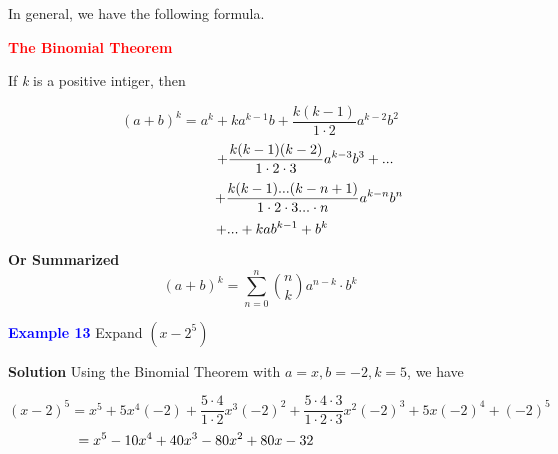 \documentclass{article}
\begin{document}
	In general, we have the following formula.

	\textcolor{red} {\textbf{The Binomial Theorem}}

	\vspace{5mm} 							%
	If \textit{k} is a positive intiger, then
	
	
	\[
		(a+b)^k = a^k + ka^{k-1} b+\frac{k(k-1)}{1\cdot2}a^{k-2} b^2
	\]
	\[
	\hspace*{2.3cm}   	+\frac{k(k-1)(k-2)}{1\cdot2\cdot3} a^{k-3} b^3 + ...
	\]
	\[
	\hspace*{2.5cm}	+\frac{k(k-1)...(k-n+1)}{1\cdot 2\cdot 3 ...\cdot n } a^{k-n} b^n 
	\]
	\[
	\hspace*{0.6cm}	+ ... + kab^{k-1}+b^k
	\]								%
									
									
	\textcolor{BlueGreen}{\textbf{Or Summarized}}
	\[
	(a+b)^k = \sum_{n=0}^{n} \binom{n}{k} a^{n-k}\cdot b^k
	\]
	
	
	\textcolor{blue}{\textbf{Example 13}}  Expand $(x-2^5)$
	
	\textbf{Solution} \quad Using the Binomial Theorem with $a = x, b = -2, k = 5$, we have
	
	\[
		(x-2)^5 = x^5 + 5x^4(-2)+\frac{5\cdot4}{1\cdot2}x^3(-2)^2+\frac{5\cdot4\cdot3}{1\cdot2\cdot3}
		x^2(-2)^3+5x(-2)^4+(-2)^5
	\]
	\[
	\hspace*{-3.2cm}	=x^5-10x^4+40x^3-80x^2+80x-32
	\]
\end{document}
